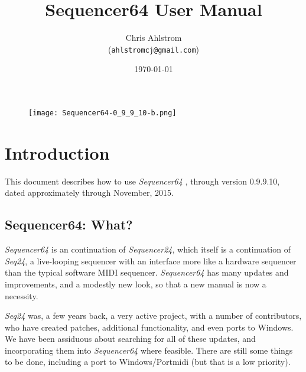\documentclass[
 11pt,
 twoside,
 a4paper,
 headinclude,
 footinclude,
 final                                 %
]{article}
\begin{document}
\title{Sequencer64 User Manual}
\author{Chris Ahlstrom \\
   (\texttt{ahlstromcj@gmail.com})}
\date{\today}
\maketitle

\begin{figure}[H]
   \centering 
   \texttt{[image: Sequencer64-0\_9\_9\_10-b.png]}
\end{figure}

\clearpage                             %

\tableofcontents
\listoffigures                         %
\listoftables                          %


\setlength{\parindent}{0pt}
\setlength{\parskip}{1ex plus 0.5ex minus 0.2ex}

\section{Introduction}
\label{sec:introduction}

   This document describes how to use \textsl{Sequencer64}
   \cite{sequencer64},
   through version 0.9.9.10, dated approximately through November, 2015.

\subsection{Sequencer64: What?}
\label{subsec:what_is_sequencer64}

   \textsl{Sequencer64} is an continuation of \textsl{Sequencer24}, 
   which itself is a continuation of \textsl{Seq24},
   a live-looping sequencer with an interface more like a hardware sequencer
   than the typical software MIDI sequencer.
   \textsl{Sequencer64} has many updates and improvements, and a modestly
   new look, so that a new manual is now a necessity.

   \textsl{Seq24} was, a few years back, a very active project, with a
   number of contributors, who have created patches, additional
   functionality, and even ports to Windows.
   We have been assiduous about searching for all of these updates, and
   incorporating them into \textsl{Sequencer64} where feasible.
   There are still some things to be done, including a port to
   Windows/Portmidi (but that is a low priority).
\end{document}
